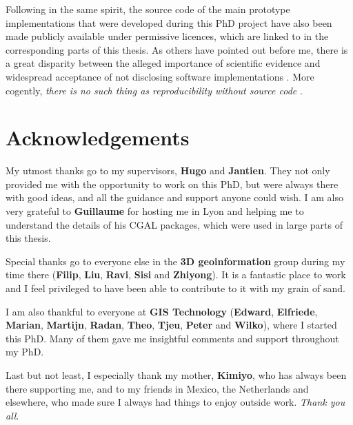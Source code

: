 Following in the same spirit, the source code of the main prototype implementations that were developed during this PhD project have also been made publicly available under permissive licences, which are linked to in the corresponding parts of this thesis.
As others have pointed out before me, there is a great disparity between the alleged importance of scientific evidence and widespread acceptance of not disclosing software implementations \citep{Morin12,Joppa13}.
More cogently, \emph{there is no such thing as reproducibility without source code} \citep{Ince12}.

\section*{Acknowledgements}

My utmost thanks go to my supervisors, \textbf{Hugo} and \textbf{Jantien}.
They not only provided me with the opportunity to work on this PhD, but were always there with good ideas, and all the guidance and support anyone could wish.
I am also very grateful to \textbf{Guillaume} for hosting me in Lyon and helping me to understand the details of his CGAL packages, which were used in large parts of this thesis.

Special thanks go to everyone else in the \textbf{3D geoinformation} group during my time there (\textbf{Filip}, \textbf{Liu}, \textbf{Ravi}, \textbf{Sisi} and \textbf{Zhiyong}).
It is a fantastic place to work and I feel privileged to have been able to contribute to it with my grain of sand.

I am also thankful to everyone at \textbf{GIS Technology} (\textbf{Edward}, \textbf{Elfriede}, \textbf{Marian}, \textbf{Martijn}, \textbf{Radan}, \textbf{Theo}, \textbf{Tjeu}, \textbf{Peter} and \textbf{Wilko}), where I started this PhD.
Many of them gave me insightful comments and support throughout my PhD.

Last but not least, I especially thank my mother, \textbf{Kimiyo}, who has always been there supporting me, and to my friends in Mexico, the Netherlands and elsewhere, who made sure I always had things to enjoy outside work.
\emph{Thank you all}.